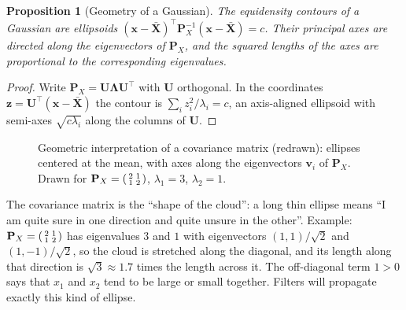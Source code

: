 \documentclass[11pt,a4paper]{article}
\newcommand{\bx}{\boldsymbol{x}}
\newcommand{\mP}{\mathbf{P}}
\newcommand{\tp}{^{\top}}
\theoremstyle{plain}
\newtheorem{proposition}[theorem]{Proposition}
\theoremstyle{definition}
\theoremstyle{remark}
\begin{document}
\begin{proposition}[Geometry of a Gaussian]\label{prop:ellipse}
The equidensity contours of a Gaussian are ellipsoids $(\bx-\bar{\boldsymbol X})\tp\mP_X^{-1}(\bx-\bar{\boldsymbol X})=c$.
Their principal axes are directed along the eigenvectors of $\mP_X$, and the squared lengths of the axes are
proportional to the corresponding eigenvalues.
\end{proposition}
\begin{proof}
Write $\mP_X=\mathbf U\boldsymbol\Lambda\mathbf U\tp$ with $\mathbf U$ orthogonal. In the coordinates
$\boldsymbol z=\mathbf U\tp(\bx-\bar{\boldsymbol X})$ the contour is $\sum_i z_i^2/\lambda_i=c$, an axis-aligned ellipsoid
with semi-axes $\sqrt{c\lambda_i}$ along the columns of $\mathbf U$.
\end{proof}

\begin{figure}[H]
\centering
{}
\caption{Geometric interpretation of a covariance matrix (redrawn): ellipses centered at the mean, with axes along the
eigenvectors $\mathbf v_i$ of $\mP_X$. Drawn for $\mP_X=\begin{psmallmatrix}2&1\\1&2\end{psmallmatrix}$,
$\lambda_1=3$, $\lambda_2=1$.}\label{fig:gauss}
\end{figure}

\begin{intuition}
The covariance matrix is the ``shape of the cloud'': a long thin ellipse means ``I am quite sure in one direction and
quite unsure in the other''. Example: $\mP_X=\begin{psmallmatrix}2&1\\1&2\end{psmallmatrix}$ has
eigenvalues $3$ and $1$ with eigenvectors $(1,1)/\sqrt2$ and $(1,-1)/\sqrt2$, so the cloud is stretched along the diagonal, and
its length along that direction is $\sqrt3\approx1.7$ times the length across it. The off-diagonal term $1>0$
says that $x_1$ and $x_2$ tend to be large or small together. Filters will propagate exactly this kind of ellipse.
\end{intuition}
\end{document}

